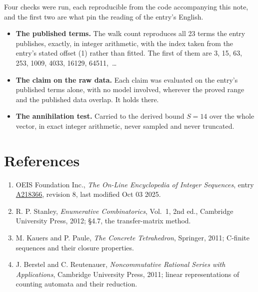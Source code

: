 \documentclass[11pt]{article}
\theoremstyle{definition}
\begin{document}
Four checks were run, each reproducible from the code accompanying this note, and the first two are what pin the reading of the entry's English.

\begin{itemize}

\item {\bfseries The published terms.} The walk count reproduces all 23 terms the entry publishes, exactly, in integer arithmetic, with the index taken from the entry's stated offset (1) rather than fitted. The first of them are 3, 15, 63, 253, 1009, 4033, 16129, 64511,~\dots

\item {\bfseries The claim on the raw data.} Each claim was evaluated on the entry's published terms alone, with no model involved, wherever the proved range and the published data overlap. It holds there.

\item {\bfseries The annihilation test.} Carried to the derived bound $S = 14$ over the whole vector, in exact integer arithmetic, never sampled and never truncated.

\end{itemize}

\section{References}

\begin{enumerate}

\item OEIS Foundation Inc., \emph{The On-Line Encyclopedia of Integer Sequences}, entry \href{https://oeis.org/A218366}{A218366}, revision 8, last modified Oct 03 2025.

\item R. P. Stanley, \emph{Enumerative Combinatorics}, Vol.~1, 2nd ed., Cambridge University Press, 2012; \S4.7, the transfer-matrix method.

\item M. Kauers and P. Paule, \emph{The Concrete Tetrahedron}, Springer, 2011; C-finite sequences and their closure properties.

\item J. Berstel and C. Reutenauer, \emph{Noncommutative Rational Series with Applications}, Cambridge University Press, 2011; linear representations of counting automata and their reduction.

\end{enumerate}
\end{document}
